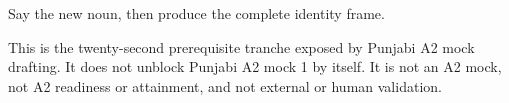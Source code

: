 \begin{tcolorbox}[breakable,colback=teal!4,colframe=teal!35!black,title={Before you move on}]
Say the new noun, then produce the complete identity frame.

This is the twenty-second prerequisite tranche exposed by Punjabi A2 mock drafting. It does not unblock Punjabi A2 mock 1 by itself. It is not an A2 mock, not A2 readiness or attainment, and not external or human validation.
\end{tcolorbox}
